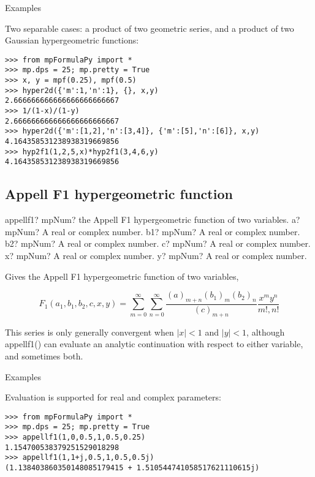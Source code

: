 Examples

Two separable cases: a product of two geometric series, and a product of two Gaussian hypergeometric functions:

\begin{lstlisting}
>>> from mpFormulaPy import *
>>> mp.dps = 25; mp.pretty = True
>>> x, y = mpf(0.25), mpf(0.5)
>>> hyper2d({'m':1,'n':1}, {}, x,y)
2.666666666666666666666667
>>> 1/(1-x)/(1-y)
2.666666666666666666666667
>>> hyper2d({'m':[1,2],'n':[3,4]}, {'m':[5],'n':[6]}, x,y)
4.164358531238938319669856
>>> hyp2f1(1,2,5,x)*hyp2f1(3,4,6,y)
4.164358531238938319669856
\end{lstlisting}




\subsection{Appell F1 hypergeometric function}

\begin{mpFunctionsExtract}
	\mpFunctionSix
	{appellf1? mpNum? the Appell F1 hypergeometric function of two variables.}
	{a? mpNum? A real or complex number.}
	{b1? mpNum? A real or complex number.}	
	{b2? mpNum? A real or complex number.}
	{c? mpNum? A real or complex number.}	
	{x? mpNum? A real or complex number.}		
	{y? mpNum? A real or complex number.}		
\end{mpFunctionsExtract}

\vpara
Gives the Appell F1 hypergeometric function of two variables,

\begin{equation}
F_1(a_1,b_1,b_2,c,x,y) = \sum_{m=0}^{\infty} \sum_{n=0}^{\infty} \frac{(a)_{m+n}(b_1)_m (b_2)_n}{(c)_{m+n}} \frac{x^my^n}{m!,n!}
\end{equation}


This series is only generally convergent when $|x|<1$ and $|y|<1$, although appellf1() can evaluate an analytic continuation with respect to either variable, and sometimes both.

Examples

Evaluation is supported for real and complex parameters:

\begin{lstlisting}
>>> from mpFormulaPy import *
>>> mp.dps = 25; mp.pretty = True
>>> appellf1(1,0,0.5,1,0.5,0.25)
1.154700538379251529018298
>>> appellf1(1,1+j,0.5,1,0.5,0.5j)
(1.138403860350148085179415 + 1.510544741058517621110615j)
\end{lstlisting}




